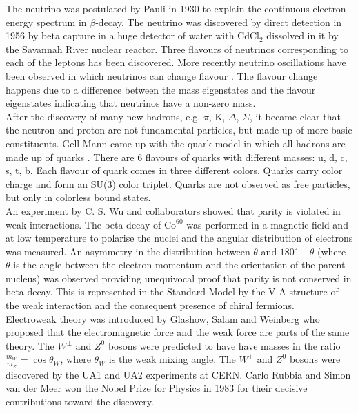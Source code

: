 The neutrino was postulated by Pauli in 1930 \cite{pauli} to explain the 
continuous electron energy spectrum in $\beta$-decay. The neutrino was 
discovered by direct detection in 1956 \cite{neutrino} by beta capture in a 
huge detector of water with CdCl$_{2}$ dissolved in it by the Savannah River 
nuclear reactor. Three flavours of neutrinos corresponding to each of the 
leptons has been discovered. More recently neutrino oscillations have been 
observed in which neutrinos can change flavour \cite{oscillations}. The 
flavour change happens due to a difference between the mass eigenstates and the 
flavour eigenstates indicating that neutrinos have a non-zero mass. \\

After the discovery of many new hadrons, e.g. $\pi$, K, $\Delta$, $\Sigma$, it
became clear that the neutron and proton are not fundamental particles, but made
up of more basic constituents. Gell-Mann came up with the quark model in which 
all hadrons are made up of quarks \cite{gellmann}. There are 6 flavours of 
quarks with different masses: u, d, c, s, t, b. Each flavour of quark comes in 
three different colors. Quarks carry color charge and form an SU(3) color 
triplet. Quarks are not observed as free particles, but only in colorless bound 
states. \\

An experiment by C. S. Wu and collaborators \cite{wu} showed that parity is 
violated in weak interactions. The beta decay of $\mbox{Co}^{60}$ was performed 
in a magnetic field and at low temperature to polarise the nuclei and the 
angular distribution of electrons was measured. An asymmetry in the distribution 
between $\theta$ and $180^{\circ} - \theta$ (where $\theta$ is the angle between 
the electron momentum and the orientation of the parent nucleus) was observed
providing unequivocal proof that parity is not conserved in beta decay. This is
represented in the Standard Model by the V-A structure of the weak interaction
and the consequent presence of chiral fermions. \\

Electroweak theory was introduced by Glashow, Salam and Weinberg \cite{salam,
weinberg} who proposed that the electromagnetic force and the weak force are 
parts of the same theory. The $W^{\pm}$ and $Z^{0}$ bosons were predicted to 
have have masses in the ratio $\frac{m_{W}}{m_{Z}} = \cos{\theta_{W}}$, where 
$\theta_{W}$ is the weak mixing angle. The $W^{\pm}$ and $Z^{0}$ bosons were 
discovered by the UA1 and UA2 experiments \cite{ua1} at CERN. Carlo Rubbia and 
Simon van der Meer won the Nobel Prize for Physics in 1983 for their decisive 
contributions toward the discovery. \\

